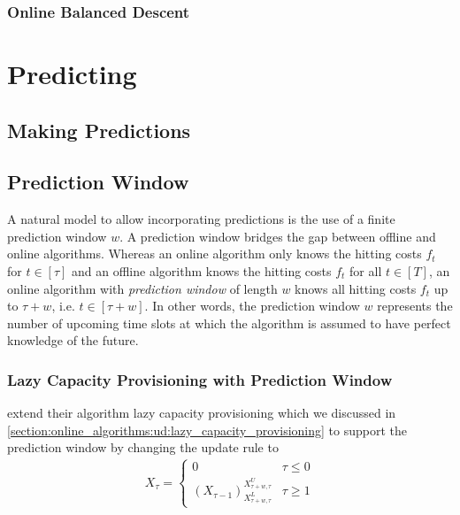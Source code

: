 \subsubsection{Online Balanced Descent}

\section{Predicting}\label{section:online_algorithms:md:predictions}

\subsection{Making Predictions}

\subsection{Prediction Window}

A natural model to allow incorporating predictions is the use of a finite prediction window $w$. A prediction window bridges the gap between offline and online algorithms. Whereas an online algorithm only knows the hitting costs $f_t$ for $t \in [\tau]$ and an offline algorithm knows the hitting costs $f_t$ for all $t \in [T]$, an online algorithm with \emph{prediction window} of length $w$ knows all hitting costs $f_t$ up to $\tau + w$, i.e. $t \in [\tau + w]$. In other words, the prediction window $w$ represents the number of upcoming time slots at which the algorithm is assumed to have perfect knowledge of the future.

\subsubsection{Lazy Capacity Provisioning with Prediction Window}

\citeauthor*{Lin2011} extend their algorithm lazy capacity provisioning which we discussed in \autoref{section:online_algorithms:ud:lazy_capacity_provisioning} to support the prediction window by changing the update rule to \begin{align*}
    X_{\tau} = \begin{cases}
        0 & \tau \leq 0 \\
        (X_{\tau-1})_{X_{\tau+w,\tau}^L}^{X_{\tau+w,\tau}^U} & \tau \geq 1
    \end{cases}
\end{align*}

